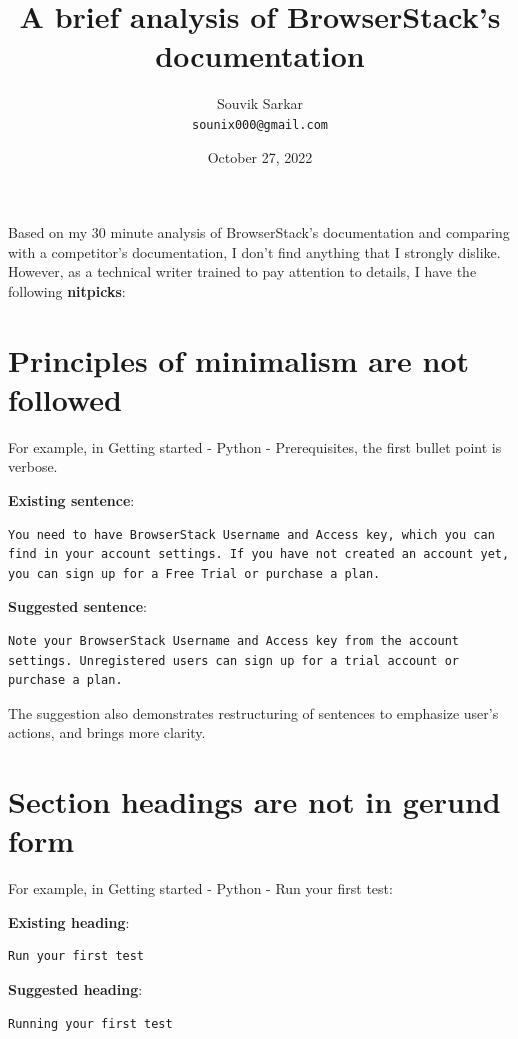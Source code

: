 \documentclass{article}
\title{\bfseries A brief analysis of BrowserStack's documentation}
\author{Souvik Sarkar \\ \texttt{sounix000@gmail.com}} %
\date{October 27, 2022}
\begin{document}
\maketitle %

Based on my 30 minute analysis of BrowserStack's documentation and comparing with a competitor's documentation, I don't find anything that I strongly dislike. However, as a technical writer trained to pay attention to details, I have the following \textbf{nitpicks}:

\section*{Principles of minimalism are not followed}

For example, in Getting started - Python - Prerequisites, the first bullet point is verbose.

\textbf{Existing sentence}:

\begin{lstlisting}
You need to have BrowserStack Username and Access key, which you can find in your account settings. If you have not created an account yet, you can sign up for a Free Trial or purchase a plan.
\end{lstlisting}

\textbf{Suggested sentence}:

\begin{lstlisting}
Note your BrowserStack Username and Access key from the account settings. Unregistered users can sign up for a trial account or purchase a plan.
\end{lstlisting}

The suggestion also demonstrates restructuring of sentences to emphasize user's actions, and brings more clarity.

\section*{Section headings are not in gerund form}

For example, in Getting started - Python - Run your first test:

\textbf{Existing heading}:

\begin{lstlisting}
Run your first test
\end{lstlisting}

\textbf{Suggested heading}:

\begin{lstlisting}
Running your first test
\end{lstlisting}
\end{document}
